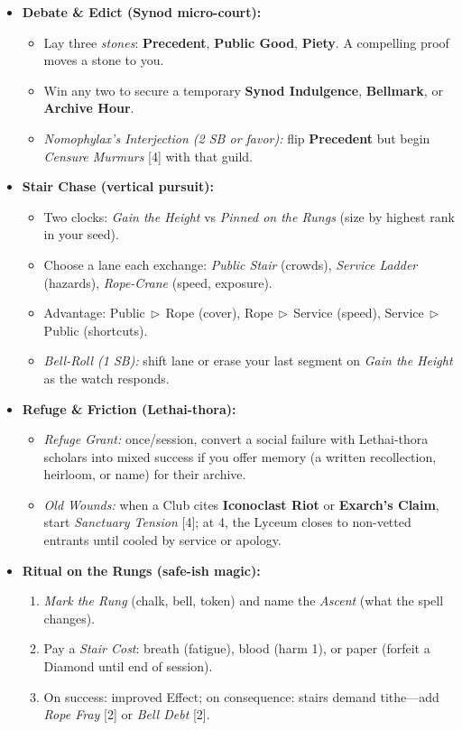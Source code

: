 \begin{itemize}
  \item \textbf{Debate \& Edict (Synod micro-court):}
  \begin{itemize}
    \item Lay three \emph{stones}: \textbf{Precedent}, \textbf{Public Good}, \textbf{Piety}. A compelling proof moves a stone to you.
    \item Win any two to secure a temporary \textbf{Synod Indulgence}, \textbf{Bellmark}, or \textbf{Archive Hour}.
    \item \emph{Nomophylax’s Interjection (2 SB or favor):} flip \textbf{Precedent} but begin \emph{Censure Murmurs} [4] with that guild.
  \end{itemize}

  \item \textbf{Stair Chase (vertical pursuit):}
  \begin{itemize}
    \item Two clocks: \emph{Gain the Height} vs \emph{Pinned on the Rungs} (size by highest rank in your seed).
    \item Choose a lane each exchange: \emph{Public Stair} (crowds), \emph{Service Ladder} (hazards), \emph{Rope-Crane} (speed, exposure).
    \item Advantage: Public\(\,\triangleright\,\)Rope (cover), Rope\(\,\triangleright\,\)Service (speed), Service\(\,\triangleright\,\)Public (shortcuts).
    \item \emph{Bell-Roll (1 SB):} shift lane or erase your last segment on \emph{Gain the Height} as the watch responds.
  \end{itemize}

  \item \textbf{Refuge \& Friction (Lethai-thora):}
  \begin{itemize}
    \item \emph{Refuge Grant:} once/session, convert a social failure with Lethai-thora scholars into mixed success if you offer memory (a written recollection, heirloom, or name) for their archive.
    \item \emph{Old Wounds:} when a Club cites \textbf{Iconoclast Riot} or \textbf{Exarch’s Claim}, start \emph{Sanctuary Tension} [4]; at 4, the Lyceum closes to non-vetted entrants until cooled by service or apology.
  \end{itemize}

  \item \textbf{Ritual on the Rungs (safe-ish magic):}
  \begin{enumerate}
    \item \emph{Mark the Rung} (chalk, bell, token) and name the \emph{Ascent} (what the spell changes).
    \item Pay a \emph{Stair Cost}: breath (fatigue), blood (harm 1), or paper (forfeit a Diamond until end of session).
    \item On success: improved Effect; on consequence: stairs demand tithe—add \emph{Rope Fray} [2] or \emph{Bell Debt} [2].
  \end{enumerate}


\end{itemize}
